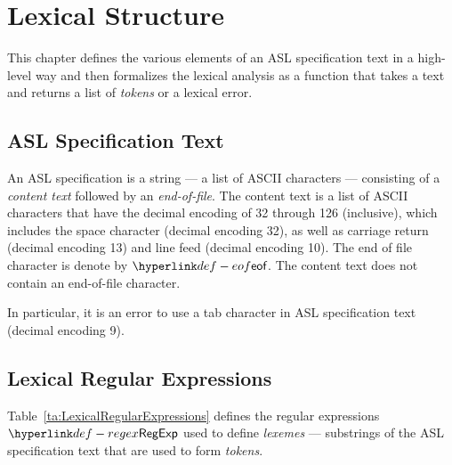 \chapter{Lexical Structure\label{chap:LexicalStructure}}
This chapter defines the various elements of an ASL specification text in a high-level way
and then formalizes the lexical analysis as a function that takes a text and returns
a list of \emph{tokens} or a lexical error.

\section{ASL Specification Text}
An ASL specification is a string --- a list of ASCII characters --- consisting of a \emph{content text}
followed by an \emph{end-of-file}.
The content text is a list of
ASCII characters that have the decimal encoding of 32 through 126 (inclusive),
which includes the space character (decimal encoding 32),
as well as
carriage return (decimal encoding 13) and line feed (decimal encoding 10).
\hypertarget{def-eof}{}
The end of file character is denote by $\eof$.
The content text does not contain an end-of-file character.

In particular, it is an error to use a tab character in ASL specification text (decimal encoding 9).

\section{Lexical Regular Expressions}

\hypertarget{def-regex}{}
Table~\ref{ta:LexicalRegularExpressions} defines the regular expressions $\RegExp$ used to define
\emph{lexemes} --- substrings of the ASL specification text that are used to form \emph{tokens}.


